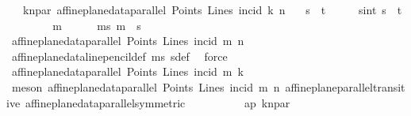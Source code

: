 \begin{isabellebody}
\ \ \ kn{\isacharunderscore}{\kern0pt}par{\isacharcolon}{\kern0pt}\ {\isachardoublequoteopen}affine{\isacharunderscore}{\kern0pt}plane{\isacharunderscore}{\kern0pt}data{\isachardot}{\kern0pt}parallel\ Points\ Lines\ {\isacharparenleft}{\kern0pt}incid{\isacharparenright}{\kern0pt}\ k\ n{\isachardoublequoteclose}\isanewline
\ \ \ {\isachardoublequoteopen}s\ {\isacharequal}{\kern0pt}\ t{\isachardoublequoteclose}\isanewline
%
\isadelimproof
%
\endisadelimproof
%
\isatagproof
{}\isamarkupfalse%
\ {\isacharminus}{\kern0pt}\isanewline
\ \ \isamarkupfalse%
\ s{\isacharunderscore}{\kern0pt}in{\isacharunderscore}{\kern0pt}t{\isacharcolon}{\kern0pt}\ {\isachardoublequoteopen}s\ {\isasymsubseteq}\ t{\isachardoublequoteclose}\isanewline
\ \ \isamarkupfalse%
\isanewline
\ \ \ \ \isamarkupfalse%
\ m\isanewline
\ \ \ \ \isamarkupfalse%
\ ms{\isacharcolon}{\kern0pt}\ {\isachardoublequoteopen}m\ {\isasymin}\ s{\isachardoublequoteclose}\isanewline
\ \ \ \ \isamarkupfalse%
\ {\isachardoublequoteopen}affine{\isacharunderscore}{\kern0pt}plane{\isacharunderscore}{\kern0pt}data{\isachardot}{\kern0pt}parallel\ Points\ Lines\ {\isacharparenleft}{\kern0pt}incid{\isacharparenright}{\kern0pt}\ m\ n{\isachardoublequoteclose}\ \isanewline
\ \ \ \ \ \ \isamarkupfalse%
\ affine{\isacharunderscore}{\kern0pt}plane{\isacharunderscore}{\kern0pt}data{\isachardot}{\kern0pt}line{\isacharunderscore}{\kern0pt}pencil{\isacharunderscore}{\kern0pt}def\ ms\ sdef\ \isamarkupfalse%
\ force\isanewline
\ \ \ \ \isamarkupfalse%
\ {\isachardoublequoteopen}affine{\isacharunderscore}{\kern0pt}plane{\isacharunderscore}{\kern0pt}data{\isachardot}{\kern0pt}parallel\ Points\ Lines\ {\isacharparenleft}{\kern0pt}incid{\isacharparenright}{\kern0pt}\ m\ k{\isachardoublequoteclose}\ \isanewline
\ \ \ \ \ \ \isamarkupfalse%
\ {\isacharparenleft}{\kern0pt}meson\ {\isacartoucheopen}affine{\isacharunderscore}{\kern0pt}plane{\isacharunderscore}{\kern0pt}data{\isachardot}{\kern0pt}parallel\ Points\ Lines\ incid\ m\ n{\isacartoucheclose}\ affine{\isacharunderscore}{\kern0pt}plane{\isachardot}{\kern0pt}parallel{\isacharunderscore}{\kern0pt}transitive{}\ affine{\isacharunderscore}{\kern0pt}plane{\isacharunderscore}{\kern0pt}data{\isachardot}{\kern0pt}parallel{\isacharunderscore}{\kern0pt}symmetric\isanewline
\ \ \ \ \ \ \ \ \ \ ap\ kn{\isacharunderscore}{\kern0pt}par{\isacharparenright}{\kern0pt}\ \isanewline

\end{isabellebody}
